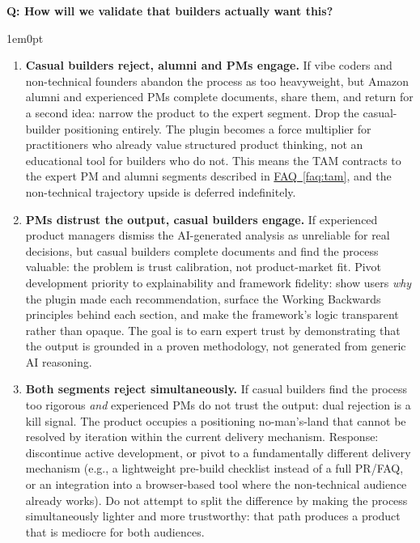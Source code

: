 \documentclass[11pt,letterpaper]{article}
\newcounter{faqnum}
\newenvironment{faqpair}[1]{%
  \needspace{4\baselineskip}%
  \vspace{0.5em}%
  \refstepcounter{faqnum}%
  \noindent\textbf{\color{SectionBlue}Q\thefaqnum: #1}\par\nopagebreak[4]%
  \vspace{0.2em}%
  \begin{adjustwidth}{1em}{0pt}%
  \setlength{\parindent}{0pt}%
}{%
  \end{adjustwidth}%
  \vspace{0.5em}%
}
\newcommand{\faqref}[1]{\hyperref[#1]{FAQ~\ref*{#1}}}
\begin{document}
\begin{faqpair}{How will we validate that builders actually want this?}
  \begin{enumerate}[nosep]
    \item[(a)] \textbf{Casual builders reject, alumni and PMs engage.} If vibe coders and non-technical founders abandon the process as too heavyweight, but Amazon alumni and experienced PMs complete documents, share them, and return for a second idea: narrow the product to the expert segment. Drop the casual-builder positioning entirely. The plugin becomes a force multiplier for practitioners who already value structured product thinking, not an educational tool for builders who do not. This means the TAM contracts to the expert PM and alumni segments described in \faqref{faq:tam}, and the non-technical trajectory upside is deferred indefinitely.
    \item[(b)] \textbf{PMs distrust the output, casual builders engage.} If experienced product managers dismiss the AI-generated analysis as unreliable for real decisions, but casual builders complete documents and find the process valuable: the problem is trust calibration, not product-market fit. Pivot development priority to explainability and framework fidelity: show users \textit{why} the plugin made each recommendation, surface the Working Backwards principles behind each section, and make the framework's logic transparent rather than opaque. The goal is to earn expert trust by demonstrating that the output is grounded in a proven methodology, not generated from generic AI reasoning.
    \item[(c)] \textbf{Both segments reject simultaneously.} If casual builders find the process too rigorous \textit{and} experienced PMs do not trust the output: dual rejection is a kill signal. The product occupies a positioning no-man's-land that cannot be resolved by iteration within the current delivery mechanism. Response: discontinue active development, or pivot to a fundamentally different delivery mechanism (e.g., a lightweight pre-build checklist instead of a full PR/FAQ, or an integration into a browser-based tool where the non-technical audience already works). Do not attempt to split the difference by making the process simultaneously lighter and more trustworthy: that path produces a product that is mediocre for both audiences.
  \end{enumerate}


\end{faqpair}
\end{document}
